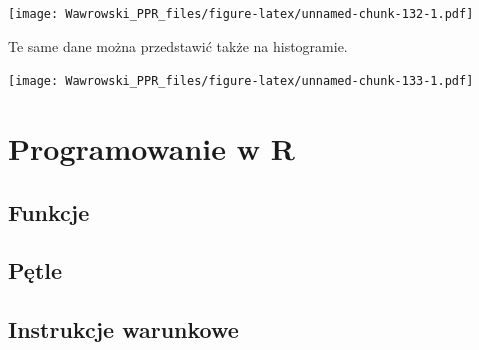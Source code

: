 \documentclass[]{book}
\newenvironment{Shaded}{\begin{snugshade}}{\end{snugshade}}
\newcommand{\KeywordTok}[1]{\textcolor[rgb]{0.13,0.29,0.53}{\textbf{#1}}}
\newcommand{\DataTypeTok}[1]{\textcolor[rgb]{0.13,0.29,0.53}{#1}}
\newcommand{\DecValTok}[1]{\textcolor[rgb]{0.00,0.00,0.81}{#1}}
\newcommand{\StringTok}[1]{\textcolor[rgb]{0.31,0.60,0.02}{#1}}
\newcommand{\OperatorTok}[1]{\textcolor[rgb]{0.81,0.36,0.00}{\textbf{#1}}}
\newcommand{\NormalTok}[1]{#1}
\begin{document}
\begin{Shaded}
\end{Shaded}

\texttt{[image: Wawrowski\_PPR\_files/figure-latex/unnamed-chunk-132-1.pdf]}

Te same dane można przedstawić także na histogramie.

\begin{Shaded}
\end{Shaded}

\texttt{[image: Wawrowski\_PPR\_files/figure-latex/unnamed-chunk-133-1.pdf]}

\chapter{Programowanie w R}\label{programowanie-w-r}

\section{Funkcje}\label{funkcje}

\section{Pętle}\label{petle}

\section{Instrukcje warunkowe}\label{instrukcje-warunkowe}
\end{document}
